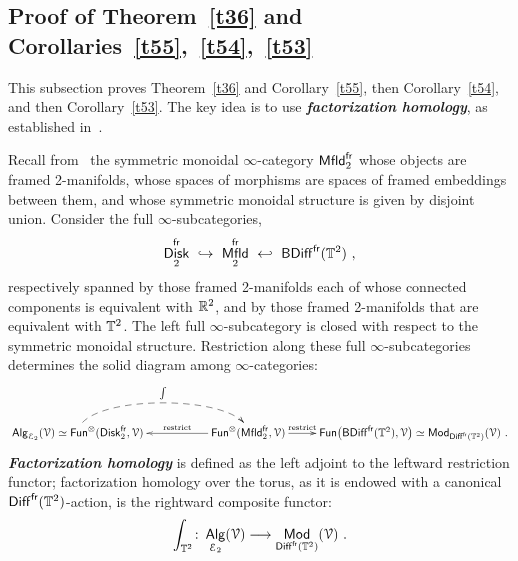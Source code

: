 \documentclass{amsart}
\theoremstyle{definition}
\theoremstyle{remark}
\DeclareMathOperator{\Alg}{\sf Alg}
\DeclareMathOperator{\Mod}{\sf Mod}
\DeclareMathOperator{\Fun}{{\sf Fun}}
\newcommand{\bit}[1]{\textbf{\textit{#1}}}
\DeclareMathOperator{\Diff}{{\sf Diff}}
\DeclareMathOperator{\Mfld}{{\sf Mfld}}
\DeclareMathOperator{\Disk}{{\sf Disk}}
\DeclareMathOperator{\fr}{\sf fr}
\def\ot{\otimes}
\def\cE{\mathcal E}\def\cF{\mathcal F}\def\cG{\mathcal G}\def\cH{\mathcal H}
\begin{document}
\subsection{Proof of Theorem~\ref{t36} and Corollaries~\ref{t55},~\ref{t54},~\ref{t53}}
\label{sec.fact.hmlgy}
This subsection proves Theorem~\ref{t36} and Corollary~\ref{t55}, then Corollary~\ref{t54}, and then Corollary~\ref{t53}.  
The key idea is to use \bit{factorization homology}, as established in~\cite{old.fact}.  

Recall from~\cite{old.fact} the symmetric monoidal $\infty$-category $\Mfld^{\fr}_2$ whose objects are framed 2-manifolds, whose spaces of morphisms are spaces of framed embeddings between them, and whose symmetric monoidal structure is given by disjoint union.
Consider the full $\infty$-subcategories,
\begin{equation}
\label{t73}
\Disk^{\fr}_2 
~\hookrightarrow ~
\Mfld^{\fr}_2 
~\hookleftarrow ~
{\sf BDiff}^{\fr}(\TT^2)
~,
\end{equation}
respectively spanned by those framed 2-manifolds each of whose connected components is equivalent with $\mathbb R^2$, and by those framed 2-manifolds that are equivalent with $\mathbb T^2$.
The left full $\infty$-subcategory is closed with respect to the symmetric monoidal structure.
Restriction along these full $\infty$-subcategories determines the solid diagram among $\infty$-categories:
\begin{equation}
\label{e75}
\xymatrix{
\Alg_{\cE_2}(\cV)
\simeq
\Fun^{\ot}(\Disk_2^{\fr} , \cV )
\ar@{-->}@(u,u)[rr]^-{\int}
&&
\Fun^{\ot}(\Mfld_2^{\fr} , \cV)
\ar[r]^-{\rm restrict}
\ar[ll]_-{\rm restrict}
&
\Fun\bigl({\sf BDiff}^{\fr}(\TT^2) , \cV \bigr)
\simeq
\Mod_{\Diff^{\fr}(\TT^2)}(\cV)
~.
}
\end{equation}
\bit{Factorization homology} is defined as the left adjoint to the leftward restriction functor; 
factorization homology over the torus, as it is endowed with a canonical $\Diff^{\fr}(\TT^2)$-action, is the rightward composite functor:
\begin{equation}
\label{e74}
\int_{\TT^2}
\colon
\Alg_{\cE_2}(\cV)
\longrightarrow
\Mod_{\Diff^{\fr}(\TT^2)}(\cV)
~.
\end{equation}
\end{document}
